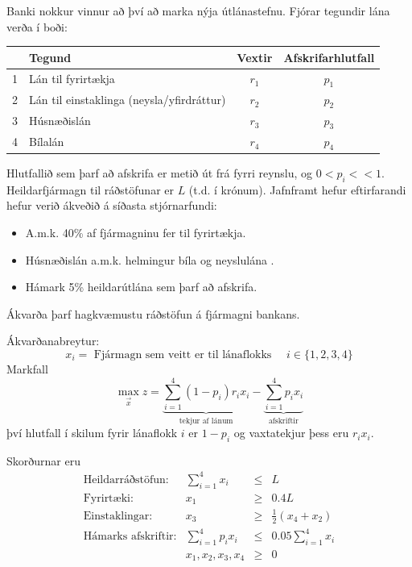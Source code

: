 \begin{samepage}
\begin{daemi}Banki nokkur vinnur að því að marka nýja útlánastefnu. Fjórar tegundir lána verða í boði:
\begin{center}{\renewcommand{\arraystretch}{1.5} \renewcommand{\tabcolsep}{0.2cm}
\begin{tabular}{|llcc|}\hline
& Tegund & Vextir & Afskrifarhlutfall \\ \hline
1 & Lán til fyrirtækja & $r_1$ & $p_1$ \\
2 & Lán til einstaklinga (neysla/yfirdráttur) & $r_2$ & $p_2$ \\
3 & Húsnæðislán & $r_3$ & $p_3$ \\
4 & Bílalán & $r_4$ & $p_4$ \\ \hline
\end{tabular}} 
\end{center} 
Hlutfallið sem þarf að afskrifa er metið út frá fyrri reynslu, og \mbox{$0<p_i<<1$}. 
Heildarfjármagn til ráðstöfunar er $L$ (t.d. í krónum). Jafnframt hefur eftirfarandi hefur verið ákveðið á síðasta stjórnarfundi:
\begin{itemize}
 \item A.m.k. 40\% af fjármagninu fer til fyrirtækja.
 \item Húsnæðislán a.m.k. helmingur bíla og neyslulána .
 \item Hámark 5\% heildarútlána sem þarf að afskrifa.
\end{itemize}
Ákvarða þarf hagkvæmustu ráðstöfun á fjármagni bankans.
\end{daemi}
\end{samepage}
\begin{lausn}
 Ákvarðanabreytur:
 $$ x_i = \textrm{ Fjármagn sem veitt er til lánaflokks } \quad i\in\{1,2,3,4\}$$
 Markfall
 $$ \max_{\vec{x}} z = \underbrace{\sum_{i=1}^4(1-p_i)r_ix_i}_{\textrm{tekjur af lánum}} - \underbrace{\sum_{i=1}^4 p_ix_i}_{\textrm{afskriftir}} $$
 því hlutfall í skilum fyrir lánaflokk $i$ er $1-p_i$ og vaxtatekjur þess eru $r_ix_i$.

 Skorðurnar eru 
{\renewcommand{\arraystretch}{1.5} \renewcommand{\tabcolsep}{0.2cm}
\[ \begin{array}{lrcl}
  \textrm{Heildarráðstöfun:}&\sum_{i=1}^4 x_i &\leq& L \\
  \textrm{Fyrirtæki:}&x_1 &\geq& 0.4 L \\
  \textrm{Einstaklingar:}&x_3 &\geq& \frac{1}{2} \left(x_4+x_2\right) \\
  \textrm{Hámarks afskriftir:}&\sum_{i=1}^4 p_ix_i &\leq& 0.05 \sum_{i=1}^4 x_i \\
  &x_1,x_2,x_3,x_4&\geq&0
 \end{array}\]}
\end{lausn}



